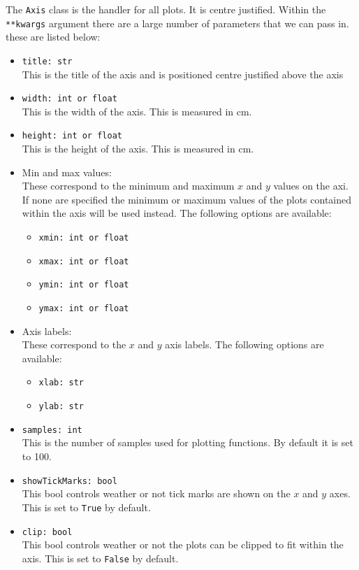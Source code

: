 \documentclass{article}
\begin{document}
The \verb|Axis| class is the handler for all plots. It is centre justified. Within the \verb|**kwargs| argument there are a large number of parameters that we can pass in. these are listed below:\begin{itemize}
\item \verb|title: str|\\This is the title of the axis and is positioned centre justified above the axis
\item \verb|width: int or float|\\This is the width of the axis. This is measured in cm.
\item \verb|height: int or float|\\This is the height of the axis. This is measured in cm.
\item Min and max values:\\
These correspond to the minimum and maximum $x$ and $y$ values on the axi. If none are specified the minimum or maximum values of the plots contained within the axis will be used instead. The following options are available:\begin{itemize}
\item \verb|xmin: int or float|
\item \verb|xmax: int or float|
\item \verb|ymin: int or float|
\item \verb|ymax: int or float|
\end{itemize}

\item Axis labels:\\
These correspond to the $x$ and $y$ axis labels. The following options are available:\begin{itemize}
\item \verb|xlab: str|
\item \verb|ylab: str|
\end{itemize}

\item \verb|samples: int|\\This is the number of samples used for plotting functions. By default it is set to 100.
\item \verb|showTickMarks: bool|\\This bool controls weather or not tick marks are shown on the $x$ and $y$ axes. This is set to \verb|True| by default.
\item \verb|clip: bool|\\This bool controls weather or not the plots can be clipped to fit within the axis. This is set to \verb|False| by default.
\end{itemize}
\end{document}

